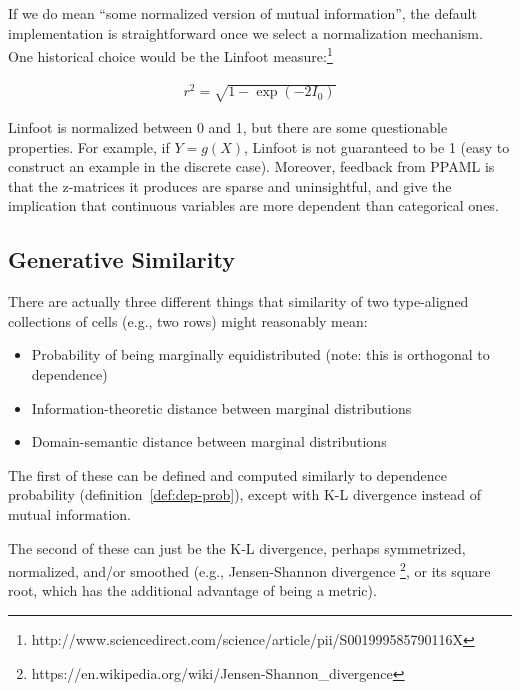 \documentclass[10pt,letterpaper]{article}
\begin{document}
If we do mean ``some normalized version of mutual information'', the
default implementation is straightforward once we select a
normalization mechanism.  One historical choice would be the Linfoot
measure:\footnote{http://www.sciencedirect.com/science/article/pii/S001999585790116X}

\begin{align*}
r^2 = \sqrt{1 - \exp{(-2I_0)}}
\end{align*}

Linfoot is normalized between 0 and 1, but there are some questionable
properties.  For example, if $Y=g(X)$, Linfoot is not guaranteed to be
1 (easy to construct an example in the discrete case).  Moreover, feedback
from PPAML is that the z-matrices it produces are sparse and
uninsightful, and give the implication that continuous variables are
more dependent than categorical ones.


\subsection{Generative Similarity}

There are actually three different things that similarity of two
type-aligned collections of cells (e.g., two rows) might reasonably
mean:

\begin{itemize}
\item Probability of being marginally equidistributed (note: this is
  orthogonal to dependence)
\item Information-theoretic distance between marginal distributions
\item Domain-semantic distance between marginal distributions
\end{itemize}

The first of these can be defined and computed similarly to dependence
probability (definition~\ref{def:dep-prob}), except with K-L
divergence instead of mutual information.

The second of these can just be the K-L divergence, perhaps
symmetrized, normalized, and/or smoothed (e.g., Jensen-Shannon
divergence \footnote{https://en.wikipedia.org/wiki/Jensen-Shannon\_divergence},
or its square root, which has the additional advantage of being a metric).
\end{document}
